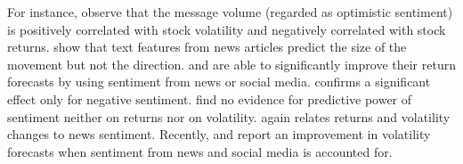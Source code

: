 \documentclass[]{article}
\begin{document}
For instance, \cite{DAS2007} observe that the message volume (regarded as optimistic sentiment) is positively correlated with stock volatility and negatively correlated with stock returns. \cite{luss2009} show that text features from news articles predict the size of the movement but not the direction. \cite{HAGENAU2013} and \cite{NGUYEN2015} are able to significantly improve their return forecasts by using sentiment from news or social media. \cite{SHANG2014} confirms a significant effect only for negative sentiment.  \cite{KIM2014} find no evidence for predictive power of sentiment neither on returns nor on volatility. \cite{smales2016} again relates returns and volatility changes to news sentiment. Recently, \cite{AUDRINO2020} and \cite{FANG2021} report an improvement in volatility forecasts when sentiment from news and social media is accounted for. 

\end{document}
